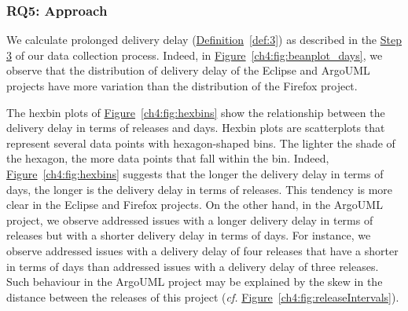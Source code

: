 \subsubsection*{RQ5: Approach} We calculate prolonged delivery delay
(\hyperref[def:3]{Definition}~\ref{def:3}) as
described in the \hyperref[settings:step3]{Step 3} of our data collection
process. Indeed, in
\hyperref[ch4:fig:beanplot_days]{Figure}~\ref{ch4:fig:beanplot_days}, we observe that
the distribution of delivery delay of the Eclipse and ArgoUML projects have more variation than
the distribution of the Firefox project.

The hexbin plots of \hyperref[ch4:fig:hexbins]{Figure}~\ref{ch4:fig:hexbins} show the
relationship between the delivery delay in terms of releases and days. Hexbin
plots are scatterplots that represent several data points with hexagon-shaped
bins. The lighter the shade of the hexagon, the more data points that fall
within the bin. Indeed, \hyperref[ch4:fig:hexbins]{Figure}~\ref{ch4:fig:hexbins}
suggests that the longer the delivery delay in terms of days, the longer is
the delivery delay in terms of releases. This tendency is more clear in the
Eclipse and Firefox projects. On the other hand, in the ArgoUML project, we
observe addressed issues with a longer delivery delay in terms of releases but
with a shorter delivery delay in terms of days. For instance, we observe addressed
issues with a delivery delay of four releases that have a shorter \DIFdelbegin {}\DIFdelend \DIFaddbegin {}\DIFaddend in terms of days than addressed issues with a delivery delay of three
releases.  Such behaviour in the ArgoUML project may be explained by the skew in
the distance between the releases of this project ({\em cf.}
\hyperref[ch4:fig:releaseIntervals]{Figure}~\ref{ch4:fig:releaseIntervals}).

